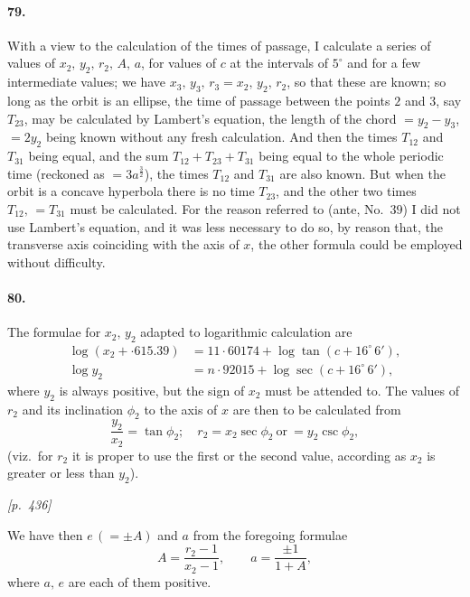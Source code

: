 \documentclass[11pt]{article}
\begin{document}
\paragraph{79.} With a view to the calculation of the times of passage, I calculate a series of values of $x_{2},\, y_{2},\, r_{2},\, A,\, a$, for values of $c$ at the intervals of $5^{\circ}$ and for a few intermediate values; we have $x_{3},\, y_{3},\, r_{3} = x_{2},\, y_{2},\, r_{2}$, so that these are known; so long as the orbit is an ellipse, the time of passage between the points $2$ and $3$, say $T_{23}$, may be calculated by Lambert's equation, the length of the chord $= y_{2} - y_{3}$, $= 2y_{2}$ being known without any fresh calculation. And then the times $T_{12}$ and $T_{31}$ being equal, and the sum $T_{12} + T_{23} + T_{31}$ being equal to the whole periodic time (reckoned as $= 3a^{\frac{3}{2}}$), the times $T_{12}$ and $T_{31}$ are also known. But when the orbit is a concave hyperbola there is no time $T_{23}$, and the other two times $T_{12},\, = T_{31}$ must be calculated. For the reason referred to (ante, No.~$39$) I did not use Lambert's equation, and it was less necessary to do so, by reason that, the transverse axis coinciding with the axis of $x$, the other formula could be employed without difficulty.

\paragraph{80.} The formulae for $x_{2},\, y_{2}$ adapted to logarithmic calculation are
\[
\begin{aligned}
\log(x_{2} + {\cdot}615.39) &= 11{\cdot}60174 + \log\tan(c + 16^{\circ}\,6'),\\
\log y_{2} &= n\!\cdot\!92015 + \log\sec(c + 16^{\circ}\,6'),
\end{aligned}
\]
where $y_{2}$ is always positive, but the sign of $x_{2}$ must be attended to. The values of $r_{2}$ and its inclination $\phi_{2}$ to the axis of $x$ are then to be calculated from
\[
\dfrac{y_{2}}{x_{2}} = \tan\phi_{2};\quad r_{2} = x_{2}\sec\phi_{2}\ \text{or}\ = y_{2}\csc\phi_{2},
\]
(viz.\ for $r_{2}$ it is proper to use the first or the second value, according as $x_{2}$ is greater or less than $y_{2}$).

\medskip
\noindent\textit{[p.~436]}

\medskip

We have then $e\,(= \pm A)$ and $a$ from the foregoing formulae
\[
A = \dfrac{r_{2} - 1}{x_{2} - 1},\qquad a = \dfrac{\pm 1}{1 + A},
\]
where $a,\, e$ are each of them positive.
\end{document}
